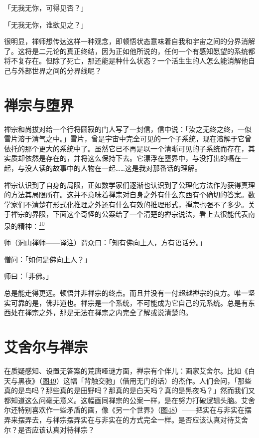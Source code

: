 \documentclass[
  12pt,
  twoside,
  openright,
  oldfontcommands,
]{memoir}
\begin{document}
「无我无你，可得见否？」

「无我无你，谁欲见之？」

很明显，禅师想传达这样一种观念，即顿悟状态意味着自我和宇宙之间的分界消解了。这将是二元论的真正终结，因为正如他所说的，任何一个有感知愿望的系统都将不复存在。但除了死亡，那还能是种什么状态？一个活生生的人怎么能消解他自己与外部世界之间的分界线呢？

\section{禅宗与堕界}

禅宗和尚拔对给一个行将圆寂的门人写了一封信，信中说：「汝之无终之终，一似雪片溶于清气之中。」雪片，曾是宇宙中完全可见的一个子系统，现在溶解于它曾依托的那个更大的系统中了。虽然它已不再是以一个清晰可见的子系统而存在，其实质却依然是存在的，并将这么保持下去。它漂浮在堕界中，与没打出的嗝在一起，与没人读的故事中的人物在一起\ldots\ldots 这是我对那番话的理解。

禅宗认识到了自身的局限，正如数学家们逐渐也认识到了公理化方法作为获得真理的方法其局限所在。这并不意味着禅宗对自身之外有什么东西有个确切的答案。数学家们不清楚在形式化推理之外还有什么有效的推理形式，禅宗也强不了多少。关于禅宗的界限，下面这个奇怪的公案给了一个清楚的禅宗说法，看上去很能代表南泉的精神：\hyperref[fn:Chapter09-10]{\textsuperscript{10}}

师{（洞山禅师------译注）}谓众曰：「知有佛向上人，方有语话分。」

僧问：「如何是佛向上人？」

师曰：「非佛。」

总是能走得更远。顿悟并非禅宗的终点。而且并没有一付超越禅宗的良方。唯一坚实可靠的是，佛非道也。禅宗是一个系统，不可能成为它自己的元系统。总是有东西处在禅宗之外，那是无法在禅宗之内完全了解或说清楚的。

\section{艾舍尔与禅宗}

在质疑感知、设置无答案的荒唐哑谜方面，禅宗有个伴儿：画家艾舍尔。比如《白天与黑夜》（\hyperref[fig:49]{图49}）这幅「背触交驰」（借用无门的话）的杰作。人们会问，「那些真的是鸟吗？那些真的是田野吗？那真的是白天吗？真的是黑夜吗？」然而我们又都知道这么问毫无意义。这幅画同禅宗的公案一样，是在努力打破逻辑头脑。艾舍尔还特别喜欢作一些矛盾的画，像《另一个世界》（\hyperref[fig:48]{图48}）------把实在与非实在摆弄来摆弄去，与禅宗摆弄实在与非实在的方式完全一样。是否应该认真对待艾舍尔？是否应该认真对待禅宗？
\end{document}
